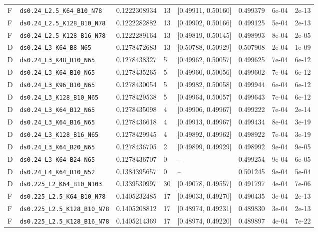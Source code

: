\begin{longtable}{@{}llrllllr@{}}
F & \texttt{ds0.24\_L2.5\_K64\_B10\_N78} & 0.1222308934 & 13 & [0.49911, 0.50160] & 0.499379 & 6e-04 & 2e-13\\
F & \texttt{ds0.24\_L2.5\_K128\_B10\_N78} & 0.1222282882 & 13 & [0.49902, 0.50166] & 0.499125 & 5e-04 & 2e-13\\
F & \texttt{ds0.24\_L2.5\_K128\_B16\_N78} & 0.1222289164 & 13 & [0.49819, 0.50145] & 0.498993 & 8e-04 & 2e-05\\
D & \texttt{ds0.24\_L3\_K64\_B8\_N65} & 0.1278472683 & 13 & [0.50788, 0.50929] & 0.507908 & 2e-04 & 1e-09\\
D & \texttt{ds0.24\_L3\_K48\_B10\_N65} & 0.1278438327 & 5 & [0.49962, 0.50057] & 0.499625 & 7e-04 & 6e-12\\
D & \texttt{ds0.24\_L3\_K64\_B10\_N65} & 0.1278435265 & 5 & [0.49960, 0.50056] & 0.499602 & 7e-04 & 6e-12\\
D & \texttt{ds0.24\_L3\_K96\_B10\_N65} & 0.1278430054 & 5 & [0.49982, 0.50058] & 0.499944 & 6e-04 & 6e-12\\
D & \texttt{ds0.24\_L3\_K128\_B10\_N65} & 0.1278429538 & 5 & [0.49964, 0.50057] & 0.499643 & 7e-04 & 6e-12\\
D & \texttt{ds0.24\_L3\_K64\_B12\_N65} & 0.1278435098 & 4 & [0.49906, 0.49967] & 0.499222 & 7e-04 & 2e-14\\
D & \texttt{ds0.24\_L3\_K64\_B16\_N65} & 0.1278436618 & 4 & [0.49913, 0.49967] & 0.499434 & 8e-04 & 3e-19\\
D & \texttt{ds0.24\_L3\_K128\_B16\_N65} & 0.1278429945 & 4 & [0.49892, 0.49962] & 0.498922 & 7e-04 & 3e-19\\
D & \texttt{ds0.24\_L3\_K64\_B20\_N65} & 0.1278436705 & 2 & [0.49899, 0.49929] & 0.498992 & 9e-04 & 9e-05\\
D & \texttt{ds0.24\_L3\_K64\_B24\_N65} & 0.1278436707 & 0 & -- & 0.499254 & 9e-04 & 6e-05\\
D & \texttt{ds0.24\_L4\_K64\_B10\_N52} & 0.1384395657 & 0 & -- & 0.501245 & 9e-04 & 5e-04\\
D & \texttt{ds0.225\_L2\_K64\_B10\_N103} & 0.1339530997 & 30 & [0.49078, 0.49557] & 0.491797 & 4e-04 & 7e-06\\
F & \texttt{ds0.225\_L2.5\_K64\_B10\_N78} & 0.1405232485 & 17 & [0.49033, 0.49270] & 0.490435 & 3e-04 & 2e-13\\
F & \texttt{ds0.225\_L2.5\_K128\_B10\_N78} & 0.1405208812 & 17 & [0.48974, 0.49231] & 0.489830 & 3e-04 & 2e-13\\
F & \texttt{ds0.225\_L2.5\_K128\_B16\_N78} & 0.1405214369 & 17 & [0.48974, 0.49220] & 0.489897 & 4e-04 & 7e-22\\

\end{longtable}
